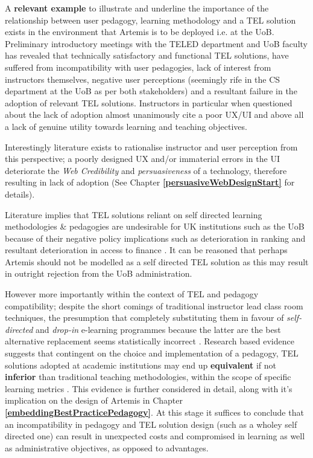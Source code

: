 A \textbf{relevant example} to illustrate  and underline the importance of the relationship between user pedagogy, learning methodology and a TEL solution exists in the environment that Artemis is to be deployed i.e. at the UoB. Preliminary introductory meetings with the TELED department and UoB faculty has revealed that technically satisfactory and functional TEL solutions, have suffered from incompatibility with user pedagogies, lack of interest from instructors themselves, negative user perceptions (seemingly rife in the CS department at the UoB as per both stakeholders) and a resultant failure in the adoption of relevant TEL solutions. Instructors in particular when questioned about the lack of adoption almost unanimously cite a poor UX/UI and above all a lack of genuine utility towards learning and teaching objectives.

Interestingly literature exists to rationalise instructor and user perception from this perspective; a poorly designed UX and/or immaterial errors in the UI deteriorate the \textit{Web Credibility} and \textit{persuasiveness} of a technology, therefore resulting in lack of adoption (See Chapter \textbf{\ref{persuasiveWebDesignStart}} for details). 

Literature  implies that TEL solutions reliant on self directed learning methodologies \& pedagogies are undesirable for UK institutions such as the UoB because of their negative policy implications such as deterioration in ranking and resultant deterioration in access to finance \cite{Gordon2014}. It can be reasoned that perhaps Artemis should not be modelled as a self directed TEL solution as this may result in outright rejection from the UoB administration.

However more importantly within the context of TEL and pedagogy compatibility; despite the short comings of traditional instructor lead class room techniques,  the presumption that  completely substituting them in favour of \textit{self-directed} and \textit{drop-in} e-learning programmes because the latter are the  best alternative replacement seems statistically incorrect \cite{RickReis,Team2008}. Research based evidence suggests that contingent on the choice and implementation of a pedagogy,  TEL solutions adopted at academic institutions may end up \textbf{equivalent} if not \textbf{inferior} than traditional teaching   methodologies, within the scope of specific learning metrics \cite{RickReis,Means2009,Team2008}. This evidence is further considered in detail, along with it's implication on the design of Artemis in Chapter \textbf{\ref{embeddingBestPracticePedagogy}}. At this stage it suffices to conclude that an incompatibility in pedagogy and TEL solution design (such as a wholey self directed one) can result in unexpected costs and compromised in learning as well as administrative objectives, as opposed to advantages. 

